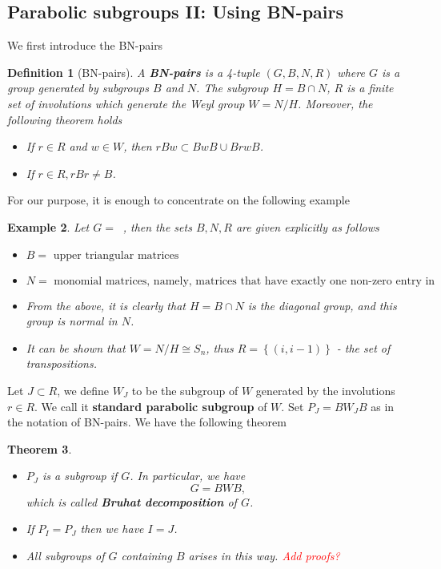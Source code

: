 \documentclass[12pt]{article} %
\newtheorem{definition}{Definition}[section]
\newtheorem{theorem}[definition]{Theorem}
\newtheorem{example}[definition]{Example}
\DeclareMathOperator{\GLn}{\text{GL}_n(\mathbb{R})}
\begin{document}
\subsection{Parabolic subgroups II: Using BN-pairs}
We first introduce the BN-pairs
\begin{definition}[BN-pairs]
    A \textbf{BN-pairs} is a 4-tuple $(G,B,N,R)$ where $G$ is a group generated by subgroups $B$ and $N$.
    The subgroup $H = B \cap N$, $R$ is a finite set of involutions which generate the \textit{Weyl group} $W= N/H$. Moreover,
    the following theorem holds
    \begin{itemize}
        \item If $ r \in R$ and $w \in W$, then $rBw \subset BwB \cup BrwB$.
        \item If $r \in R, rBr \ne B$.
    \end{itemize}
\end{definition}
For our purpose, it is enough to concentrate on the following example
\begin{example}
    Let $G = \GLn$, then the sets $B,N,R$ are given explicitly as follows
    \begin{itemize}
        \item $B = \text{ upper triangular matrices}$
        \item $N = \text{ monomial matrices, namely, matrices that have exactly one non-zero entry in each row and column}$
        \item From the above, it is clearly that $H = B \cap N$ is the diagonal group, and this group is normal in $N$.
        \item It can be shown that $W = N/H \cong S_n$, thus $R = \left\lbrace (i,i-1)\right\rbrace $ - the set of transpositions.
    \end{itemize}
\end{example}
Let $J \subset R$, we define $W_J$ to be the subgroup of $W$ generated by the involutions
$r \in R$. We call it \textbf{standard parabolic subgroup} of $W$. Set $P_J = BW_JB$ as in the notation of
BN-pairs. We have the following theorem
\begin{theorem}
    \hfill
    \begin{itemize}
        \item $P_J$ is a subgroup if $G$. In particular, we have
              \[G = BWB,\]
              which is called \textbf{Bruhat decomposition} of $G$.
        \item If $P_I=P_J$ then we have $I=J$.
        \item All subgroups of $G$ containing $B$ arises in this way. \textcolor{red}{Add proofs?}
    \end{itemize}
\end{theorem}
\end{document}
